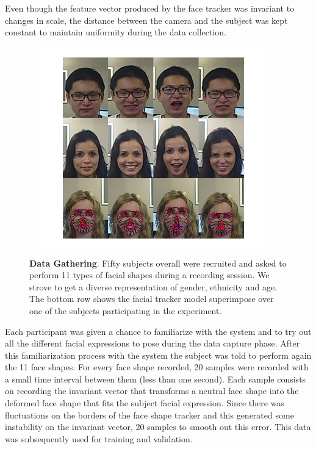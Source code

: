 \documentclass[]{article}
\begin{document}
Even though the feature vector produced  by the face tracker was invariant to changes in scale, the distance
between the camera and the subject was kept constant to maintain uniformity during the data collection.

\begin{figure}[ht]
\begin{center}
\vspace{-3mm}
\includegraphics[width=0.95\textwidth,height=90mm]{figures/dataExtrationExamples.jpg}
\end{center}
\caption{\textbf{Data Gathering}. Fifty subjects overall were recruited  and asked to perform 11 types of facial shapes during a recording session.
We strove to  get a diverse representation of gender, ethnicity and age. The bottom row shows the facial tracker model superimpose 
over one of the subjects participating in the experiment.}
\label{comparationBetweenFaces}
\end{figure}

Each participant was given a chance to familiarize with the system and to try out  all the different facial expressions
to pose  during the data capture phase. After this familiarization process with the system the subject was told to
perform again the 11 face shapes. For every face shape recorded, 20 samples were recorded with a small time interval
between them (less than one second). Each sample consists on recording the invariant vector that transforms a neutral
face shape into the deformed face shape that fits the subject facial expression. Since there was fluctuations on the
borders of the face shape tracker and this generated some instability on the invariant vector, 20 samples to smooth out
this error. This data was subsequently used for training and validation.
\end{document}
